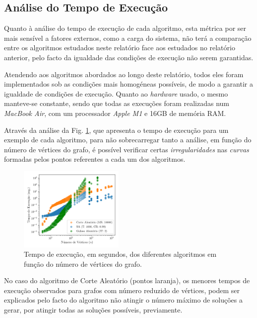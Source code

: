 \documentclass[mirror, portugues]{revdetua}
\begin{document}
\subsection{Análise do Tempo de Execução}

Quanto à análise do tempo de execução de cada algoritmo, esta métrica por ser mais sensível a fatores externos, como a carga do sistema, não terá a comparação entre os algoritmos estudados neste relatório face aos estudados no relatório anterior, pelo facto da igualdade das condições de execução não serem garantidas.

Atendendo aos algoritmos abordados ao longo deste relatório, todos eles foram implementados sob as condições mais homogéneas possíveis, de modo a garantir a igualdade de condições de execução. Quanto ao \textit{hardware} usado, o mesmo manteve-se constante, sendo que todas as execuções foram realizadas num \textit{MacBook Air}, com um processador \textit{Apple M1} e 16GB de memória RAM.

Através da análise da Fig. \ref{fig:time_all}, que apresenta o tempo de execução para um exemplo de cada algoritmo, para não sobrecarregar tanto a análise, em função do número de vértices do grafo, é possível verificar certas \textit{irregularidades} nas \textit{curvas} formadas pelos pontos referentes a cada um dos algoritmos.

\begin{figure}[H]
    \centering
    \includegraphics[width=0.45\textwidth]{../assets/time_all.png}
    \caption{Tempo de execução, em segundos, dos diferentes algoritmos em função do número de vértices do grafo.}
    \label{fig:time_all}
\end{figure}

No caso do algoritmo de Corte Aleatório (pontos laranja), os menores tempos de execução observados para grafos com número reduzido de vértices, podem ser explicados pelo facto do algoritmo não atingir o número máximo de soluções a gerar, por atingir todas as soluções possíveis, previamente.
\end{document}
